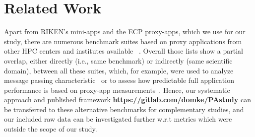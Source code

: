 \section{Related Work}\label{sec:relwork}
%
Apart from RIKEN's mini-apps and the ECP proxy-apps, which we use for our study, there are numerous benchmark suites
based on proxy applications from other HPC centers and institutes available
~\cite{prace_unified_2016,noauthor_mantevo_nodate,nersc_characterization_nodate,llnl_llnl_nodate,llnl_coral_nodate,spec_spec_nodate}.
Overall those lists show a partial overlap, either directly (i.e., same benchmark) or indirectly (same
scientific domain), between all these suites, which, for example, were used to analyze message passing characteristic~\cite{klenk_overview_2017} or to assess how predictable full application performance is
based on proxy-app measurements~\cite{barrett_assessing_2015}.
Hence, our systematic approach and published framework \textbf{\url{https://gitlab.com/domke/PAstudy}} can be
transferred to these alternative benchmarks for complementary studies, and our included raw data
can be investigated further w.r.t metrics which were outside the scope of our study.


